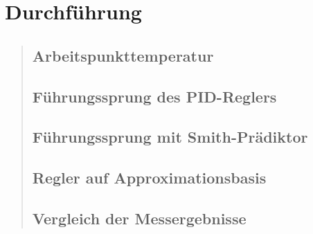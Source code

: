 

\section{Durchführung}
\begin{quote}
    
    
    \subsection{Arbeitspunkttemperatur}
    \begin{quote}
        
    \end{quote}
    
    
    \subsection{Führungssprung des PID-Reglers}
    \begin{quote}
        
    \end{quote}
    
    
    \subsection{Führungssprung mit Smith-Prädiktor}
    \begin{quote}
        
    \end{quote}
    
    
    \subsection{Regler auf Approximationsbasis}
    \begin{quote}
        
    \end{quote}
    
    
    \subsection{Vergleich der Messergebnisse}
    \begin{quote}
        
    \end{quote}
    
    
    
    
\end{quote}

